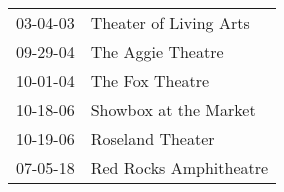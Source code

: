 \begin{supertabular}{p{0.25\columnwidth}p{0.75\columnwidth}}
 03-04-03 &  Theater of Living Arts \\
 09-29-04 &       The Aggie Theatre \\
 10-01-04 &         The Fox Theatre \\
 10-18-06 &   Showbox at the Market \\
 10-19-06 &        Roseland Theater \\
 07-05-18 &  Red Rocks Amphitheatre \\
\end{supertabular}

